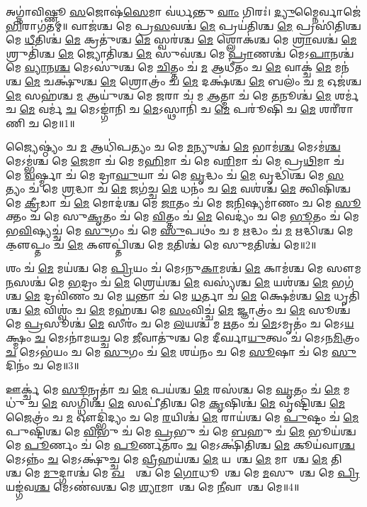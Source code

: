 𑌅𑌗𑍍𑌨𑌾॑𑌵𑌿𑌷𑍍𑌣𑍂 \ul{𑌸}𑌜𑍋𑌷॑\ul{𑌸𑍇}𑌮𑌾 𑌵॑𑌰𑍍𑌧𑌨𑍍𑌤𑍁 \ul{𑌵𑌾𑌂} 𑌗𑌿𑌰𑌃॑। \ul{𑌦𑍍𑌯𑍁}𑌮𑍍𑌨𑍈𑌰𑍍𑌵𑌾𑌜𑍇॑\ul{𑌭𑌿}𑌰𑌾\-𑌗॑𑌤𑌮𑍍॥ 
𑌵𑌾𑌜॑𑌶𑍍𑌚 𑌮𑍇 𑌪𑍍𑌰\ul{𑌸}𑌵𑌶𑍍𑌚॑ \ul{𑌮𑍇} 𑌪𑍍𑌰𑌯॑𑌤𑌿𑌶𑍍𑌚 \ul{𑌮𑍇} 𑌪𑍍𑌰𑌸𑌿॑𑌤𑌿𑌶𑍍𑌚 𑌮𑍇 \ul{𑌧𑍀}𑌤𑌿𑌶𑍍𑌚॑ \ul{𑌮𑍇} 𑌕𑍍𑌰𑌤𑍁॑𑌶𑍍𑌚 \ul{𑌮𑍇} 𑌸𑍍𑌵𑌰॑𑌶𑍍𑌚 \ul{𑌮𑍇} 𑌶𑍍𑌲𑍋𑌕॑𑌶𑍍𑌚 𑌮𑍇 \ul{𑌶𑍍𑌰𑌾}𑌵𑌶𑍍𑌚॑ \ul{𑌮𑍇} 𑌶𑍍𑌰𑍁𑌤𑌿॑𑌶𑍍𑌚 \ul{𑌮𑍇} 𑌜𑍍𑌯𑍋𑌤𑌿॑𑌶𑍍𑌚 \ul{𑌮𑍇} 𑌸𑍁𑌵॑𑌶𑍍𑌚 𑌮𑍇 \ul{𑌪𑍍𑌰𑌾}𑌣𑌶𑍍𑌚॑ 𑌮𑍇𑌽\ul{𑌪𑌾}𑌨𑌶𑍍𑌚॑ 𑌮𑍇 \ul{𑌵𑍍𑌯𑌾}𑌨\ul{𑌶𑍍𑌚} 𑌮𑍇𑌽𑌸𑍁॑𑌶𑍍𑌚 𑌮𑍇 \ul{𑌚𑌿}𑌤𑍍𑌤𑌂 𑌚॑ \ul{𑌮} 𑌆𑌧𑍀॑𑌤𑌂 𑌚 \ul{𑌮𑍇} 𑌵𑌾𑌕𑍍𑌚॑ \ul{𑌮𑍇} 𑌮𑌨॑𑌶𑍍𑌚 \ul{𑌮𑍇} 𑌚𑌕𑍍𑌷𑍁॑𑌶𑍍𑌚 \ul{𑌮𑍇} 𑌶𑍍𑌰𑍋𑌤𑍍𑌰𑌂॑ 𑌚 \ul{𑌮𑍇} 𑌦𑌕𑍍𑌷॑𑌶𑍍𑌚 \ul{𑌮𑍇} 𑌬𑌲𑌂॑ 𑌚 \ul{𑌮} 𑌓𑌜॑𑌶𑍍𑌚 \ul{𑌮𑍇} 𑌸𑌹॑𑌶𑍍𑌚 \ul{𑌮} 𑌆𑌯𑍁॑𑌶𑍍𑌚 𑌮𑍇 \ul{𑌜}𑌰𑌾 𑌚॑ 𑌮 \ul{𑌆}𑌤𑍍𑌮𑌾 𑌚॑ 𑌮𑍇 \ul{𑌤}𑌨𑍂𑌶𑍍𑌚॑ \ul{𑌮𑍇} 𑌶𑌰𑍍𑌮॑ 𑌚 \ul{𑌮𑍇} 𑌵𑌰𑍍𑌮॑ \ul{𑌚} 𑌮𑍇𑌽𑌙𑍍𑌗𑌾॑𑌨𑌿 𑌚 \ul{𑌮𑍇}𑌽𑌸𑍍𑌥𑌾𑌨𑌿॑ 𑌚 \ul{𑌮𑍇} 𑌪𑌰𑍂॑𑌷𑌿 𑌚 \ul{𑌮𑍇} 𑌶𑌰𑍀॑𑌰𑌾𑌣𑌿 𑌚 𑌮𑍇॥1॥ 

𑌜𑍍𑌯𑍈𑌷𑍍𑌠𑍍𑌯𑌂॑ 𑌚 \ul{𑌮} 𑌆𑌧𑌿॑𑌪𑌤𑍍𑌯𑌂 𑌚 𑌮𑍇 \ul{𑌮}𑌨𑍍𑌯𑍁𑌶𑍍𑌚॑ \ul{𑌮𑍇} 𑌭𑌾𑌮॑\ul{𑌶𑍍𑌚} 𑌮𑍇𑌽𑌮॑\ul{𑌶𑍍𑌚} 𑌮𑍇𑌽𑌮𑍍𑌭॑𑌶𑍍𑌚 𑌮𑍇 \ul{𑌜𑍇}𑌮𑌾 𑌚॑ 𑌮𑍇 𑌮\ul{𑌹𑌿}𑌮𑌾 𑌚॑ 𑌮𑍇 𑌵\ul{𑌰𑌿}𑌮𑌾 𑌚॑ 𑌮𑍇 𑌪𑍍𑌰\ul{𑌥𑌿}𑌮𑌾 𑌚॑ 𑌮𑍇 \ul{𑌵}𑌰𑍍𑌷𑍍𑌮𑌾 𑌚॑ 𑌮𑍇 𑌦𑍍𑌰𑌾\ul{𑌘𑍁}𑌯𑌾 𑌚॑ 𑌮𑍇 \ul{𑌵𑍃}𑌦𑍍𑌧𑌂 𑌚॑ \ul{𑌮𑍇} 𑌵𑍃𑌦𑍍𑌧𑌿॑𑌶𑍍𑌚 𑌮𑍇 \ul{𑌸}𑌤𑍍𑌯𑌂 𑌚॑ 𑌮𑍇 \ul{𑌶𑍍𑌰}𑌦𑍍𑌧𑌾 𑌚॑ \ul{𑌮𑍇} 𑌜𑌗॑𑌚𑍍𑌚 \ul{𑌮𑍇} 𑌧𑌨𑌂॑ 𑌚 \ul{𑌮𑍇} 𑌵𑌶॑𑌶𑍍𑌚 \ul{𑌮𑍇} 𑌤𑍍𑌵𑌿𑌷𑌿॑𑌶𑍍𑌚 𑌮𑍇 \ul{𑌕𑍍𑌰𑍀}𑌡𑌾 𑌚॑ \ul{𑌮𑍇} 𑌮𑍋𑌦॑𑌶𑍍𑌚 𑌮𑍇 \ul{𑌜𑌾}𑌤𑌂 𑌚॑ 𑌮𑍇 𑌜\ul{𑌨𑌿}𑌷𑍍𑌯𑌮𑌾॑𑌣𑌂 𑌚 𑌮𑍇 \ul{𑌸𑍂}𑌕𑍍𑌤𑌂 𑌚॑ 𑌮𑍇 𑌸𑍁\ul{𑌕𑍃}𑌤𑌂 𑌚॑ 𑌮𑍇 \ul{𑌵𑌿}𑌤𑍍𑌤𑌂 𑌚॑ \ul{𑌮𑍇} 𑌵𑍇𑌦𑍍𑌯𑌂॑ 𑌚 𑌮𑍇 \ul{𑌭𑍂}𑌤𑌂 𑌚॑ 𑌮𑍇 𑌭\ul{𑌵𑌿}𑌷𑍍𑌯𑌚𑍍𑌚॑ 𑌮𑍇 \ul{𑌸𑍁}𑌗𑌂 𑌚॑ 𑌮𑍇 \ul{𑌸𑍁}𑌪𑌥𑌂॑ 𑌚 𑌮 \ul{𑌋}𑌦𑍍𑌧𑌂 𑌚॑ \ul{𑌮} 𑌋𑌦𑍍𑌧𑌿॑𑌶𑍍𑌚 𑌮𑍇 𑌕𑍢॒𑌪𑍍𑌤𑌂 𑌚॑ \ul{𑌮𑍇} 𑌕𑍢𑌪𑍍𑌤𑌿॑𑌶𑍍𑌚 𑌮𑍇 \ul{𑌮}𑌤𑌿𑌶𑍍𑌚॑ 𑌮𑍇 𑌸𑍁\ul{𑌮}𑌤𑌿𑌶𑍍𑌚॑ 𑌮𑍇॥2॥ 

𑌶𑌂 𑌚॑ \ul{𑌮𑍇} 𑌮𑌯॑𑌶𑍍𑌚 𑌮𑍇 \ul{𑌪𑍍𑌰𑌿}𑌯𑌂 𑌚॑ 𑌮𑍇𑌽𑌨𑍁\ul{𑌕𑌾}𑌮𑌶𑍍𑌚॑ \ul{𑌮𑍇} 𑌕𑌾𑌮॑𑌶𑍍𑌚 𑌮𑍇 𑌸𑍗𑌮\ul{𑌨}𑌸𑌶𑍍𑌚॑ 𑌮𑍇 \ul{𑌭}𑌦𑍍𑌰𑌂 𑌚॑ \ul{𑌮𑍇} 𑌶𑍍𑌰𑍇𑌯॑𑌶𑍍𑌚 \ul{𑌮𑍇} 𑌵𑌸𑍍𑌯॑𑌶𑍍𑌚 \ul{𑌮𑍇} 𑌯𑌶॑𑌶𑍍𑌚 \ul{𑌮𑍇} 𑌭𑌗॑𑌶𑍍𑌚 \ul{𑌮𑍇} 𑌦𑍍𑌰𑌵𑌿॑𑌣𑌂 𑌚 𑌮𑍇 \ul{𑌯}𑌨𑍍𑌤𑌾 𑌚॑ 𑌮𑍇 \ul{𑌧}𑌰𑍍𑌤𑌾 𑌚॑ \ul{𑌮𑍇} 𑌕𑍍𑌷𑍇𑌮॑𑌶𑍍𑌚 \ul{𑌮𑍇} 𑌧𑍃𑌤𑌿॑𑌶𑍍𑌚 \ul{𑌮𑍇} 𑌵𑌿𑌶𑍍𑌵𑌂॑ 𑌚 \ul{𑌮𑍇} 𑌮𑌹॑𑌶𑍍𑌚 𑌮𑍇 \ul{𑌸𑌂}𑌵𑌿𑌚𑍍𑌚॑ \ul{𑌮𑍇} 𑌜𑍍𑌞𑌾𑌤𑍍𑌰𑌂॑ 𑌚 \ul{𑌮𑍇} 𑌸𑍂𑌶𑍍𑌚॑ 𑌮𑍇 \ul{𑌪𑍍𑌰}𑌸𑍂𑌶𑍍𑌚॑ \ul{𑌮𑍇} 𑌸𑍀𑌰𑌂॑ 𑌚 𑌮𑍇 \ul{𑌲}𑌯𑌶𑍍𑌚॑ 𑌮 \ul{𑌋}𑌤𑌂 𑌚॑ \ul{𑌮𑍇}𑌽𑌮𑍃𑌤𑌂॑ 𑌚 𑌮𑍇𑌽\ul{𑌯}𑌕𑍍𑌷𑍍𑌮𑌂 \ul{𑌚} 𑌮𑍇𑌽𑌨𑌾॑𑌮𑌯𑌚𑍍𑌚 𑌮𑍇 \ul{𑌜𑍀}𑌵𑌾𑌤𑍁॑𑌶𑍍𑌚 𑌮𑍇 𑌦𑍀𑌰𑍍𑌘𑌾\ul{𑌯𑍁}𑌤𑍍𑌵𑌂 𑌚॑ 𑌮𑍇𑌽𑌨\ul{𑌮𑌿}𑌤𑍍𑌰𑌂 \ul{𑌚} 𑌮𑍇𑌽𑌭॑𑌯𑌂 𑌚 𑌮𑍇 \ul{𑌸𑍁}𑌗𑌂 𑌚॑ \ul{𑌮𑍇} 𑌶𑌯॑𑌨𑌂 𑌚 𑌮𑍇 \ul{𑌸𑍂}𑌷𑌾 𑌚॑ 𑌮𑍇 \ul{𑌸𑍁}𑌦𑌿𑌨𑌂॑ 𑌚 𑌮𑍇॥3॥ 

𑌊𑌰𑍍𑌕𑍍𑌚॑ 𑌮𑍇 \ul{𑌸𑍂}𑌨𑍃𑌤𑌾॑ 𑌚 \ul{𑌮𑍇} 𑌪𑌯॑𑌶𑍍𑌚 \ul{𑌮𑍇} 𑌰𑌸॑𑌶𑍍𑌚 𑌮𑍇 \ul{𑌘𑍃}𑌤𑌂 𑌚॑ \ul{𑌮𑍇} 𑌮𑌧𑍁॑ 𑌚 \ul{𑌮𑍇} 𑌸𑌗𑍍𑌧𑌿॑𑌶𑍍𑌚 \ul{𑌮𑍇} 𑌸𑌪𑍀॑𑌤𑌿𑌶𑍍𑌚 𑌮𑍇 \ul{𑌕𑍃}𑌷𑌿𑌶𑍍𑌚॑ \ul{𑌮𑍇} 𑌵𑍃𑌷𑍍𑌟𑌿॑𑌶𑍍𑌚 \ul{𑌮𑍇} 𑌜𑍈𑌤𑍍𑌰𑌂॑ 𑌚 \ul{𑌮} 𑌔𑌦𑍍𑌭𑌿॑𑌦𑍍𑌯𑌂 𑌚 𑌮𑍇 \ul{𑌰}𑌯𑌿𑌶𑍍𑌚॑ \ul{𑌮𑍇} 𑌰𑌾𑌯॑𑌶𑍍𑌚 𑌮𑍇 \ul{𑌪𑍁}𑌷𑍍𑌟𑌂 𑌚॑ \ul{𑌮𑍇} 𑌪𑍁𑌷𑍍𑌟𑌿॑𑌶𑍍𑌚 𑌮𑍇 \ul{𑌵𑌿}𑌭𑍁 𑌚॑ 𑌮𑍇 \ul{𑌪𑍍𑌰}𑌭𑍁 𑌚॑ 𑌮𑍇 \ul{𑌬}𑌹𑍁 𑌚॑ \ul{𑌮𑍇} 𑌭𑍂𑌯॑𑌶𑍍𑌚 𑌮𑍇 \ul{𑌪𑍂}𑌰𑍍𑌣𑌂 𑌚॑ 𑌮𑍇 \ul{𑌪𑍂}𑌰𑍍𑌣𑌤॑𑌰𑌂 \ul{𑌚} 𑌮𑍇𑌽𑌕𑍍𑌷𑌿॑𑌤𑌿𑌶𑍍𑌚 \ul{𑌮𑍇} 𑌕𑍂𑌯॑𑌵𑌾\ul{𑌶𑍍𑌚} 𑌮𑍇𑌽𑌨𑍍𑌨𑌂॑ \ul{𑌚} 𑌮𑍇𑌽𑌕𑍍𑌷𑍁॑𑌚𑍍𑌚 𑌮𑍇 \ul{𑌵𑍍𑌰𑍀}𑌹𑌯॑𑌶𑍍𑌚 \ul{𑌮𑍇} 𑌯𑌵𑌾᳚𑌶𑍍𑌚 \ul{𑌮𑍇} 𑌮𑌾𑌷𑌾᳚𑌶𑍍𑌚 \ul{𑌮𑍇} 𑌤𑌿𑌲𑌾᳚𑌶𑍍𑌚 𑌮𑍇 \ul{𑌮𑍁}𑌦𑍍𑌗𑌾𑌶𑍍𑌚॑ 𑌮𑍇 \ul{𑌖}𑌲𑍍𑌵𑌾᳚𑌶𑍍𑌚 𑌮𑍇 \ul{𑌗𑍋}𑌧𑍂𑌮𑌾᳚𑌶𑍍𑌚 𑌮𑍇 \ul{𑌮}𑌸𑍁𑌰𑌾᳚𑌶𑍍𑌚 𑌮𑍇 \ul{𑌪𑍍𑌰𑌿}𑌯𑌙𑍍𑌗॑𑌵\ul{𑌶𑍍𑌚} 𑌮𑍇𑌽𑌣॑𑌵𑌶𑍍𑌚 𑌮𑍇 \ul{𑌶𑍍𑌯𑌾}𑌮𑌾𑌕𑌾᳚𑌶𑍍𑌚 𑌮𑍇 \ul{𑌨𑍀}𑌵𑌾𑌰𑌾᳚𑌶𑍍𑌚 𑌮𑍇॥4॥ 

